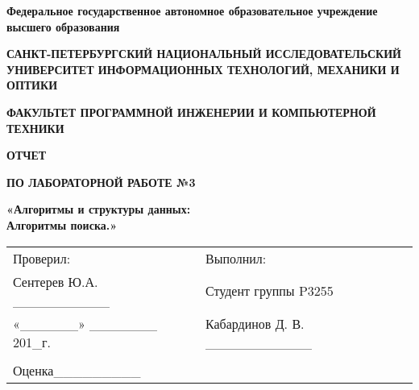 \documentclass[12pt]{article}
\begin{document}
\setlength{\parindent}{0pt}
\pagestyle{empty}
\begin{center}
\normalsize
\textbf{Федеральное государственное автономное образовательное учреждение высшего образования}

\small
\medskip 
\textbf{САНКТ-ПЕТЕРБУРГСКИЙ НАЦИОНАЛЬНЫЙ ИССЛЕДОВАТЕЛЬСКИЙ  УНИВЕРСИТЕТ ИНФОРМАЦИОННЫХ ТЕХНОЛОГИЙ, МЕХАНИКИ И ОПТИКИ}

\medskip 
\textbf{ФАКУЛЬТЕТ ПРОГРАММНОЙ ИНЖЕНЕРИИ И КОМПЬЮТЕРНОЙ ТЕХНИКИ}
\end{center}
\bigskip\bigskip\bigskip\bigskip\bigskip\bigskip\bigskip\bigskip\bigskip\bigskip\bigskip\bigskip
\begin{center}
\par\medskip\par\smallskip
\Large
 
\par\smallskip
\textbf{ОТЧЕТ} 

\textbf{ПО ЛАБОРАТОРНОЙ РАБОТЕ №3}

\large
\par\bigskip
\textbf{«Алгоритмы и структуры данных: \\ Алгоритмы поиска.»}
\par\bigskip\par\bigskip\par\bigskip\par\bigskip\par\bigskip\par\bigskip
\par\bigskip\par\bigskip\par\bigskip\par\bigskip\par\bigskip\par\bigskip
\par\bigskip\par\bigskip\par\bigskip\par\bigskip\par\bigskip\par\bigskip
\end{center}
\begin{center}
\begin{tabular}{lllll}
Проверил:	 	 						& \hspace{80pt}	&	Выполнил:										&\\
Сентерев Ю.А.	 \_\_\_\_\_\_\_\_\_\_	&			    &	Студент группы P3255							&\\
«\_\_\_\_\_\_» 	 \_\_\_\_\_\_\_ 201\_г.  & 				&	Кабардинов Д. В. \_\_\_\_\_\_\_\_\_\_\_			&\\
										&				&													&\\
Оценка\hspace{12pt}\_\_\_\_\_\_\_\_\_	&				&													&\\
\end{tabular}
\par\bigskip\par\bigskip\par\bigskip
                                                  
\par\bigskip \par\bigskip
\end{center}
\end{document}

